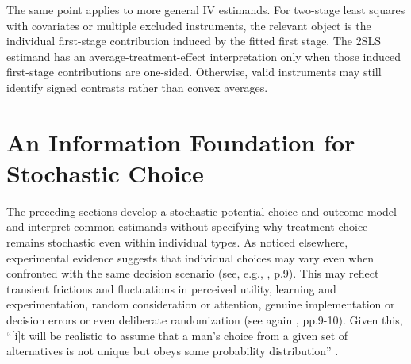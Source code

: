 \documentclass[11pt]{article}
\newcommand{\1}{\mathbf{1}}
\begin{document}
The same point applies to more general IV estimands. For two-stage least squares with
covariates or multiple excluded instruments, the relevant object is the individual first-stage
contribution induced by the fitted first stage. The 2SLS estimand has an average-treatment-effect
interpretation only when those induced first-stage contributions are one-sided. Otherwise,
valid instruments may still identify signed contrasts rather than convex averages.


\section{An Information Foundation for Stochastic Choice}
\label{sec:information}

The preceding sections develop a stochastic potential choice and outcome
model and interpret common estimands without specifying why treatment choice
remains stochastic even within individual types. As noticed elsewhere, experimental evidence suggests that individual choices may vary even when confronted with the same decision scenario (see, e.g., \cite{strzalecki2025}, p.9). This may reflect transient frictions and fluctuations in perceived utility, learning and experimentation, random consideration or attention, genuine implementation or decision errors or even deliberate randomization (see again \cite{strzalecki2025}, pp.9-10). Given this, ``[i]t will be
realistic to assume that a man's choice from a given set of alternatives is
not unique but obeys some probability distribution''
\citep[p.~312]{marschak1960}.
\end{document}
